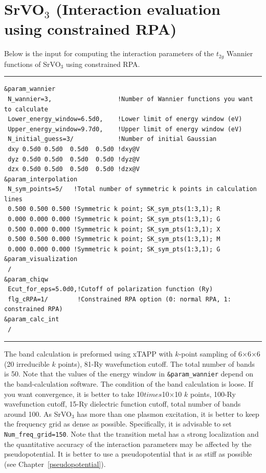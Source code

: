 \documentclass{article}
\begin{document}
\clearpage 

\section{\label{SrVO3}SrVO$_3$ (Interaction evaluation using constrained RPA)} 
Below is the input for computing the interaction parameters of the $t_{2g}$ Wannier functions of SrVO$_3$ using constrained RPA.
\vspace{3mm}\hrule
\begin{verbatim}
&param_wannier 
 N_wannier=3,                  !Number of Wannier functions you want to calculate
 Lower_energy_window=6.5d0,    !Lower limit of energy window (eV)
 Upper_energy_window=9.7d0,    !Upper limit of energy window (eV)
 N_initial_guess=3/            !Number of initial Gaussian
 dxy 0.5d0 0.5d0  0.5d0  0.5d0 !dxy@V
 dyz 0.5d0 0.5d0  0.5d0  0.5d0 !dyz@V
 dzx 0.5d0 0.5d0  0.5d0  0.5d0 !dzx@V
&param_interpolation   
 N_sym_points=5/   !Total number of symmetric k points in calculation lines
 0.500 0.500 0.500 !Symmetric k point; SK_sym_pts(1:3,1); R 
 0.000 0.000 0.000 !Symmetric k point; SK_sym_pts(1:3,1); G 
 0.500 0.000 0.000 !Symmetric k point; SK_sym_pts(1:3,1); X 
 0.500 0.500 0.000 !Symmetric k point; SK_sym_pts(1:3,1); M 
 0.000 0.000 0.000 !Symmetric k point; SK_sym_pts(1:3,1); G 
&param_visualization   
 / 
&param_chiqw
 Ecut_for_eps=5.0d0,!Cutoff of polarization function (Ry)
 flg_cRPA=1/        !Constrained RPA option (0: normal RPA, 1: constrained RPA)
&param_calc_int 
 /
\end{verbatim}
\hrule\vspace{3mm}
The band calculation is preformed using {\sc xTAPP} with $k$-point sampling of 6$\times$6$\times$6 (20 irreducible $k$ points), 81-Ry wavefunction cutoff. The total number of bands is 50. Note that the values of the energy window in {\tt \&param\_wannier} depend on the band-calculation software. The condition of the band calculation is loose. If you want convergence, it is better to take 10$times$10$\times$10 $k$ points, 100-Ry wavefunction cutoff, 15-Ry dielectric function cutoff, total number of bands around 100. As SrVO$_3$ has more than one plasmon excitation, it is better to keep the frequency grid as dense as possible. Specifically, it is advisable to set {\tt Num\_freq\_grid=150}. Note that the transition metal has a strong localization and the quantitative accuracy of the interaction parameters may be affected by the pseudopotential. It is better to use a pseudopotential that is as stiff as possible (see Chapter~\ref{pseudopotential}).  
\end{document}

